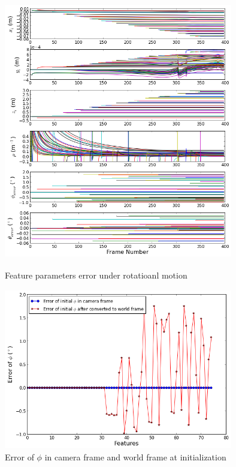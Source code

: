 \begin{figure}[h]
  \centering
  \includegraphics[width=10cm, height=12cm]{./Figures/SimulationFigures/Figure25.png}
  \caption{Feature parameters error under rotatioanl motion}
  \label{fig:simfig25}
\end{figure}

\begin{figure}[h]
  \centering
  \includegraphics[width=10cm, height=7cm]{./Figures/SimulationFigures/Figure26.png}
  \caption{Error of $\phi$ in camera frame and world frame at initialization}
  \label{fig:simfig26}
\end{figure}

\FloatBarrier
